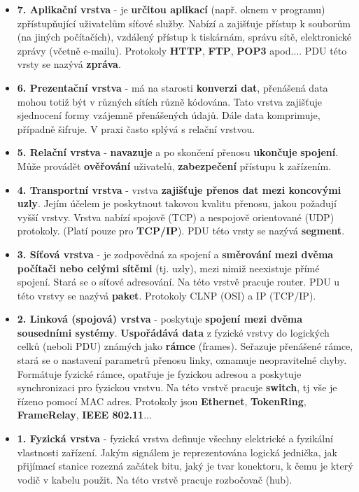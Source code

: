\begin{itemize}
    \item\textbf{7. Aplikační vrstva }- je \textbf{určitou aplikací} (např. oknem v programu) zpřístupňující uživatelům síťové služby. Nabízí a zajišťuje přístup k souborům (na jiných počítačích), vzdálený přístup k tiskárnám, správu sítě, elektronické zprávy (včetně e-mailu). Protokoly \textbf{HTTP}, \textbf{FTP}, \textbf{POP3} apod.... PDU této vrsty se nazývá \textbf{zpráva}.
    \item\textbf{6. Prezentační vrstva} - má na starosti \textbf{konverzi dat}, přenášená data mohou totiž být v různých sítích různě kódována. Tato vrstva zajišťuje sjednocení formy vzájemně přenášených údajů. Dále data komprimuje, případně šifruje. V praxi často splývá s relační vrstvou.
    \item \textbf{5. Relační vrstva} - \textbf{navazuje} a po skončení přenosu \textbf{ukončuje} \textbf{spojení}. Může provádět \textbf{ověřování} uživatelů, \textbf{zabezpečení} přístupu k zařízením.
    \item\textbf{4. Transportní vrstva} - vrstva\textbf{ zajišťuje přenos dat mezi koncovými uzly}. Jejím účelem je poskytnout takovou kvalitu přenosu, jakou požadují vyšší vrstvy. Vrstva nabízí spojově (TCP) a nespojově orientované (UDP) protokoly. (Platí pouze pro \textbf{TCP/IP}). PDU této vrsty se nazývá \textbf{segment}.
    \item\textbf{3. Síťová vrstva }- je zodpovědná za spojení a \textbf{směrování mezi dvěma počítači nebo celými sítěmi} (tj. uzly), mezi nimiž neexistuje přímé spojení. Stará se o síťové adresování. Na této vrstvě pracuje router. PDU u této vrstvy se nazývá \textbf{paket}. Protokoly CLNP (OSI) a IP (TCP/IP).
    \item \textbf{2. Linková (spojová) vrstva }- poskytuje \textbf{spojení mezi dvěma sousedními systémy}. \textbf{Uspořádává data} z fyzické vrstvy do logických celků (neboli PDU) známých jako \textbf{rámce} (frames). Seřazuje přenášené rámce, stará se o nastavení parametrů přenosu linky, oznamuje neopravitelné chyby. Formátuje fyzické rámce, opatřuje je fyzickou adresou a poskytuje synchronizaci pro fyzickou vrstvu. Na této vrstvě pracuje \textbf{switch}, tj vše je řízeno pomocí MAC adres. Protokoly jsou \textbf{Ethernet}, \textbf{TokenRing}, \textbf{FrameRelay}, \textbf{IEEE 802.11}...
    \item\textbf{1. Fyzická vrstva }- fyzická vrstva definuje všechny elektrické a fyzikální vlastnosti zařízení. Jakým signálem je reprezentována logická jednička, jak přijímací stanice rozezná začátek bitu, jaký je tvar konektoru, k čemu je který vodič v kabelu použit. Na této vrstvě pracuje rozbočovač (hub).
\end{itemize}

